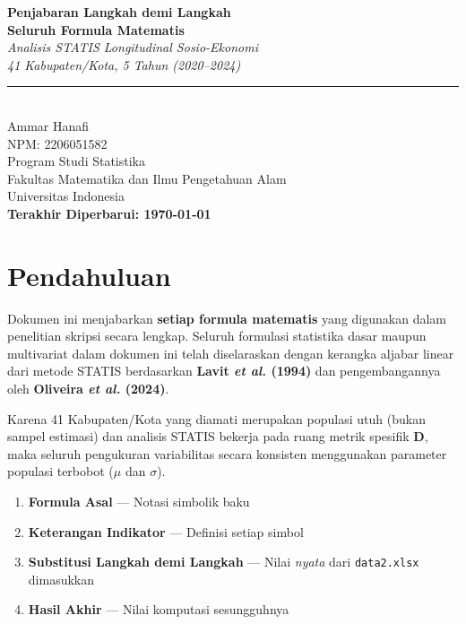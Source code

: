 \documentclass[11pt,a4paper]{article}
\begin{document}
\begin{titlepage}
  \centering
  \vspace*{3cm}
  {\Huge\bfseries Penjabaran Langkah demi Langkah\\[0.5em]
  Seluruh Formula Matematis\\[1em]}
  {\Large\textit{Analisis STATIS Longitudinal Sosio-Ekonomi\\
  41 Kabupaten/Kota, 5 Tahun (2020--2024)}}\\[3em]
  \rule{0.6\textwidth}{0.5pt}\\[1.5em]
  {\large Ammar Hanafi\\NPM: 2206051582\\[0.5em]
  Program Studi Statistika\\
  Fakultas Matematika dan Ilmu Pengetahuan Alam\\
  Universitas Indonesia\\[1.5em]
  \textbf{Terakhir Diperbarui: \today}}
  \vspace*{3cm}
\end{titlepage}

\tableofcontents
\newpage

\section*{Pendahuluan} \label{sec:method}
Dokumen ini menjabarkan \textbf{setiap formula matematis} yang digunakan dalam penelitian skripsi secara lengkap. Seluruh formulasi statistika dasar maupun multivariat dalam dokumen ini telah diselaraskan dengan kerangka aljabar linear dari metode STATIS berdasarkan \textbf{Lavit \textit{et al.} (1994)} dan pengembangannya oleh \textbf{Oliveira \textit{et al.} (2024)}.

Karena 41 Kabupaten/Kota yang diamati merupakan populasi utuh (bukan sampel estimasi) dan analisis STATIS bekerja pada ruang metrik spesifik $\mathbf{D}$, maka seluruh pengukuran variabilitas secara konsisten menggunakan parameter populasi terbobot ($\mu$ dan $\sigma$).
\begin{enumerate}
  \item \textbf{Formula Asal} --- Notasi simbolik baku
  \item \textbf{Keterangan Indikator} --- Definisi setiap simbol
  \item \textbf{Substitusi Langkah demi Langkah} --- Nilai \emph{nyata} dari \texttt{data2.xlsx} dimasukkan
  \item \textbf{Hasil Akhir} --- Nilai komputasi sesungguhnya
\end{enumerate}
\end{document}
